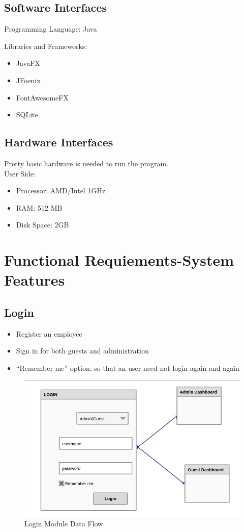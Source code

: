 \documentclass{scrreprt}
\begin{document}
\section{Software Interfaces}

Programming Language: Java

Libraries and Frameworks:
\begin{itemize}
\item JavaFX 
\item JFoenix
\item FontAwesomeFX
\item SQLite
\end{itemize}



\section{Hardware Interfaces}

Pretty basic hardware is needed to run the program.\\
User Side:
\begin{itemize}
\item Processor: AMD/Intel 1GHz
\item RAM: 512 MB
\item Disk Space: 2GB
\end{itemize}


\chapter{Functional Requiements-System Features}


\section{Login}
\begin{itemize}
\item Register an employee
\item Sign in for both guests and administration
\item “Remember me” option, so that an user need not login again and again
\end{itemize}
\begin{figure}
\includegraphics[scale=0.45]{login}
\caption{Login Module Data Flow}
\end{figure}
\end{document}
